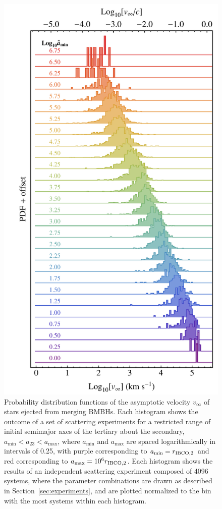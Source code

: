 \documentclass[a4paper,twocolumn]{emulateapj}
\begin{document}
{\begin{figure}
\centering\includegraphics[width=0.9\linewidth,clip=true]{vinfPDF}
\caption{Probability distribution functions of the asymptotic velocity $v_{\infty}$ of stars ejected from merging BMBHs. Each histogram shows the outcome of a set of scattering experiments for a restricted range of initial semimajor axes of the tertiary about the secondary, $a_{\min} < a_{23} < a_{\max}$, where $a_{\min}$ and $a_{\max}$ are spaced logarithmically in intervals of 0.25, with purple corresponding to $a_{\min} = r_{\rm IBCO,2}$ and red corresponding to $a_{\max} = 10^{6} r_{\rm IBCO,2}$. Each histogram shows the results of an independent scattering experiment composed of 4096 systems, where the parameter combinations are drawn as described in Section~\ref{sec:experiments}, and are plotted normalized to the bin with the most systems within each histogram.}
\label{fig:vinfpdf}
\end{figure}

}
\end{document}
